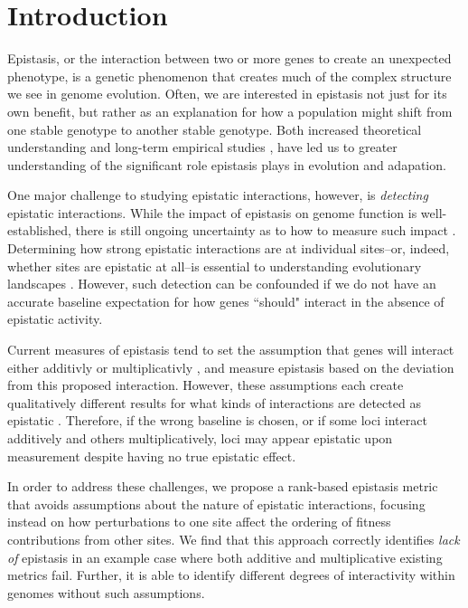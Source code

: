 \section{Introduction}

Epistasis, or the interaction between two or more genes to create an unexpected phenotype, is a genetic phenomenon that creates much of the complex structure we see in genome evolution. Often, we are interested in epistasis not just for its own benefit, but rather as an explanation for how a population might shift from one stable genotype to another stable genotype. Both increased theoretical understanding \citep{weinreich_should_2013, payne_causes_2019} and long-term empirical studies \citep{khan_negative_2011, wiser_long-term_2013, gupta_shared_2016}, have led us to greater understanding of the significant role epistasis plays in evolution and adapation.

One major challenge to studying epistatic interactions, however, is \textit{detecting} epistatic interactions. While the impact of epistasis on genome function is well-established, there is still ongoing uncertainty as to how to measure such impact \citep{cordell_epistasis_2002,de_visser_causes_2011, mackay_epistasis_2014, niel_survey_2015}. Determining how strong epistatic interactions are at individual sites--or, indeed, whether sites are epistatic at all--is essential to understanding evolutionary landscapes \citep{weinreich_should_2013}. However, such detection can be confounded if we do not have an accurate baseline expectation for how genes ``should" interact in the absence of epistatic activity. 

Current measures of epistasis tend to set the assumption that genes will interact either additivly \citep{ostman_impact_2011} or multiplicativly \citep{elena_test_1997}, and measure epistasis based on the deviation from this proposed interaction. However, these assumptions each create qualitatively different results for what kinds of interactions are detected as epistatic \citep{puniyani_meaning_2004}. Therefore, if the wrong baseline is chosen, or if some loci interact additively and others multiplicatively, loci may appear epistatic upon measurement despite having no true epistatic effect.

In order to address these challenges, we propose a rank-based epistasis metric that avoids assumptions about the nature of epistatic interactions, focusing instead on how perturbations to one site affect the ordering of fitness contributions from other sites. We find that this approach correctly identifies \textit{lack of} epistasis in an example case where both additive and multiplicative existing metrics fail. Further, it is able to identify different degrees of interactivity within genomes without such assumptions.